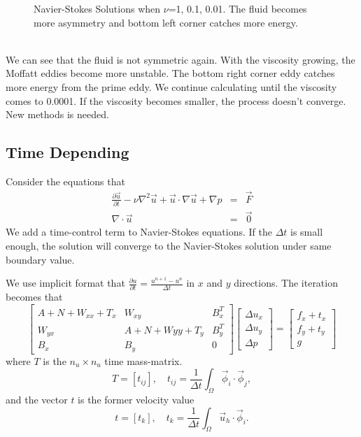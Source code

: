 \documentclass[a4paper]{article}
\begin{document}
\begin{figure}[h]
\caption{Navier-Stokes Solutions when $\nu$=1, 0.1, 0.01. The fluid becomes more asymmetry and bottom left corner catches more energy.}
\label{im::Navier-Stoke-solution}
\end{figure}
\\
We can see that the fluid is not symmetric again. With the viscosity growing, the Moffatt eddies become more unstable. The bottom right corner eddy catches more energy from the prime eddy. We continue calculating until the viscosity comes to 0.0001. If the viscosity becomes smaller, the process doesn't converge. New methods is needed.
\subsection{Time Depending}
Consider the equations that
\begin{equation}
\begin{array}{rcl}
\frac{\partial\vec{u}}{\partial t}-\nu \nabla^2 \vec{u} + \vec{u}\cdot \nabla \vec{u} + \nabla p &=& \vec{F} \\
\nabla \cdot \vec{u} &=& \vec{0}
\label{eq::Timedepending-problem}
\end{array}
\end{equation}
We add a time-control term to Navier-Stokes equations. If the $\Delta t$ is small enough, the solution will converge to the Navier-Stokes solution under same boundary value.


We use implicit format that $\frac{\partial u}{\partial t} = \frac{u^{n+1}-u^{n}}{\Delta t}$ in $x$ and $y$ directions.
The iteration becomes that
\begin{equation}
\left[ \begin{array}{ccc}
A + N +W_{xx} + T_x & W_{xy} & B_x^T \\
W_{yx} & A +N +W{yy} + T_y& B_y^T \\
B_x & B_y & 0
\end{array}
\right]
\left[\begin{array}{ccc}
\Delta u_x\\
\Delta u_y\\
\Delta p
\end{array}
\right]=
\left[\begin{array}{ccc}
f_x + t_x\\
f_y + t_y\\
g
\end{array}
\right]
\label{Timedepending}
\end{equation}
where $T$ is the $n_u\times n_u$ time mass-matrix.
\begin{equation}
T = [t_{ij}],\quad t_{ij}=\frac{1}{\Delta t}\int_{\Omega}\vec{\phi}_i\cdot\vec{\phi}_j,
\end{equation}
and the vector $t$ is the former velocity value
\begin{equation}
t = [t_{k}],\quad t_{k}=\frac{1}{\Delta t}\int_{\Omega}\vec{u}_h\cdot\vec{\phi}_i.
\end{equation}
\\
\end{document}

